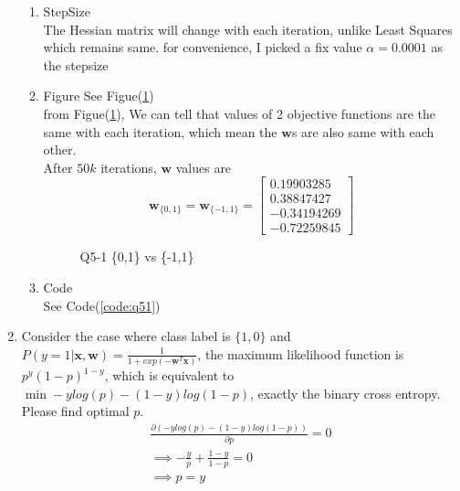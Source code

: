 \documentclass[11pt]{article}
\newcommand{\mfile}[1]  {{\small }} %
\newcommand{\vct}[1]{\mathbf{#1}}
\def \vw {\vct{w}}
\def \vx {\vct{x}}
\begin{document}
\begin{enumerate}
\begin{enumerate}
		\item StepSize
		\\
		The Hessian matrix will change with each iteration, unlike Least Squares which remains same. for convenience, I picked a 
		fix value $\alpha = 0.0001$ as the stepsize 
		\item  Figure
		See Figue(\ref{fig:q51})\\
		from Figue(\ref{fig:q51}), We can tell that values of 2 objective functions are the same with each iteration,
		which mean the $\vw$s are also same with each other.\\
		After $50k$ iterations, $\vw$ values are 
		$$\vw_{\{0,1\}} = \vw_{\{-1,1\}} = \begin{bmatrix}
			0.19903285\\
			0.38847427\\
			-0.34194269\\
			-0.72259845
		\end{bmatrix}$$    
		\begin{figure}[h!]
			\centering
			\caption{Q5-1 \{0,1\} vs \{-1,1\}}\label{fig:q51}
		  \end{figure} 
		\item Code\\
		See Code(\ref{code:q51})
	\end{enumerate}
	\item Consider the case where class label is $\{1,0\}$ and $P(y=1|\vx,\vw)=\frac{1}{1+exp(-\vw^T\vx)}$, the maximum likelihood function is $p^y(1-p)^{1-y}$, which is equivalent to $\min -ylog(p)-(1-y)log(1-p)$, exactly the binary cross entropy. Please find optimal $p$.
	\begin{align*}
		\frac{\partial \left(-ylog(p)-(1-y)log(1-p)\right)}{\partial p} = 0\\
		\implies -\frac{y}{p} + \frac{1-y}{1-p} =0\\
		\implies p=y
	\end{align*}
	

\end{enumerate}
\end{document}
